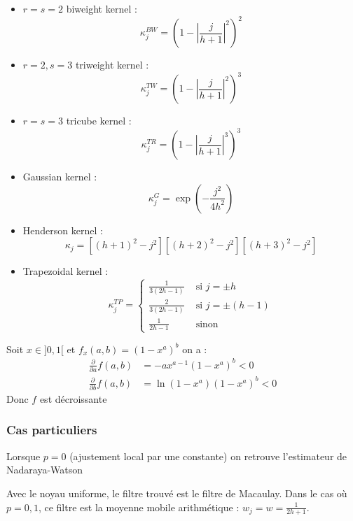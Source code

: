 \documentclass[
  12pt,
  ,
  french]{article}
\begin{document}
\begin{multicols}{2}
\begin{itemize}

\item $r=s=2$ biweight kernel :
$$\kappa_j^{BW}=\left(
  1-
  \left\lvert
  \frac j {h+1}
  \right\lvert^2
\right)^2$$

\item $r = 2, s = 3$ triweight kernel :
$$\kappa_j^{TW}=\left(
  1-
  \left\lvert
  \frac j {h+1}
  \right\lvert^2
\right)^3$$

\item $r = s = 3$ tricube kernel :
$$\kappa_j^{TR}=\left(
  1-
  \left\lvert
  \frac j {h+1}
  \right\lvert^3
\right)^3$$

\item Gaussian kernel  :
$$
\kappa_j^G=\exp\left(
-\frac{
  j^2
}{
  4h^2
}\right)
$$
\item Henderson kernel :
$$
\kappa_{j}=\left[(h+1)^{2}-j^{2}\right]\left[(h+2)^{2}-j^{2}\right]\left[(h+3)^{2}-j^{2}\right]
$$

\item Trapezoidal kernel :
$$
\kappa_j^{TP}=
\begin{cases}
  \frac{1}{3(2h-1)} & \text{ si }j=\pm h 
  \\
  \frac{2}{3(2h-1)} & \text{ si }j=\pm (h-1)\\
  \frac{1}{2h-1}& \text{ sinon}
\end{cases}
$$

\end{itemize}
\end{multicols}

Soit \(x\in ]0,1[\) et \(f_x(a,b)=\left(1-x^{a}\right)^{b}\)
on a :
\begin{align*}
\frac{\partial}{\partial a}f(a,b) &=-ax^{a-1}(1-x^{a})^{b}<0 \\
\frac{\partial}{\partial b}f(a,b)&=\ln(1-x^{a})(1-x^{a})^{b} <0
\end{align*}
Donc \(f\) est décroissante

\hypertarget{cas-particuliers}{%
\subsubsection{Cas particuliers}\label{cas-particuliers}}

Lorsque \(p=0\) (ajustement local par une constante) on retrouve l'estimateur de Nadaraya-Watson

Avec le noyau uniforme, le filtre trouvé est le filtre de Macaulay. Dans le cas où \(p=0,1\), ce filtre est la moyenne mobile arithmétique : \(w_j=w=\frac{1}{2h+1}\).
\end{document}
